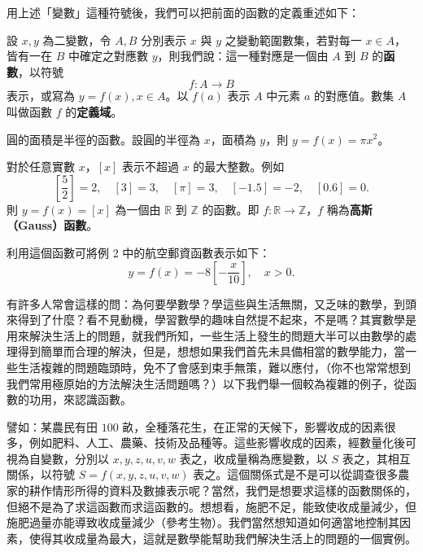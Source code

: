 用上述「變數」這種符號後，我們可以把前面的函數的定義重述如下：
\begin{definition*}
設 $x, y$ 為二變數，令 $A, B$ 分別表示 $x$ 與 $y$ 之變動範圍數集，若對每一 $x \in A$，皆有一在 $B$ 中確定之對應數 $y$，則我們說：這一種對應是一個由 $A$ 到 $B$ 的\textbf{函數}，以符號
\begin{equation*}
  f: A \longrightarrow B
\end{equation*}
表示，或寫為 $y=f(x), x \in A$。以 $f(a)$ 表示 $A$ 中元素 $a$ 的對應值。數集 $A$ 叫做函數 $f$ 的\textbf{定義域}。
\end{definition*}

\begin{example}\label{ex:5-3-3}
圓的面積是半徑的函數。設圓的半徑為 $x$，面積為 $y$，則 $y=f(x)=\pi x^2$。
\end{example}

\begin{example}\label{ex:5-3-4}
對於任意實數 $x$，$[x]$ 表示不超過 $x$ 的最大整數。例如
\begin{equation*}
  \left[\frac{5}{2}\right]=2, \quad [3]=3, \quad [\pi]=3, \quad [-1.5]=-2, \quad [0.6]=0.
\end{equation*}
則 $y=f(x)=[x]$ 為一個由 $\mathbb{R}$ 到 $\mathbb{Z}$ 的函數。即 $f: \mathbb{R} \longrightarrow \mathbb{Z}$，$f$ 稱為\textbf{高斯（Gauss）函數}。
\end{example}

利用這個函數可將例 2 中的航空郵資函數表示如下：
\begin{equation*}
  y = f(x) = -8 \left[-\frac{x}{10}\right], \quad x > 0.
\end{equation*}

有許多人常會這樣的問：為何要學數學？學這些與生活無關，又乏味的數學，到頭來得到了什麼？看不見動機，學習數學的趣味自然提不起來，不是嗎？其實數學是用來解決生活上的問題，就我們所知，一些生活上發生的問題大半可以由數學的處理得到簡單而合理的解決，但是，想想如果我們首先未具備相當的數學能力，當一些生活複雜的問題臨頭時，免不了會感到束手無策，難以應付，（你不也常常想到我們常用極原始的方法解決生活問題嗎？）以下我們舉一個較為複雜的例子，從函數的功用，來認識函數。

譬如：某農民有田 $100$ 畝，全種落花生，在正常的天候下，影響收成的因素很多，例如肥料、人工、農藥、技術及品種等。這些影響收成的因素，經數量化後可視為自變數，分別以 $x, y, z, u, v, w$ 表之，收成量稱為應變數，以 $S$ 表之，其相互關係，以符號 $S=f(x, y, z, u, v, w)$ 表之。這個關係式是不是可以從調查很多農家的耕作情形所得的資料及數據表示呢？當然，我們是想要求這樣的函數關係的，但絕不是為了求這函數而求這函數的。想想看，施肥不足，能致使收成量減少，但施肥過量亦能導致收成量減少（參考生物）。我們當然想知道如何適當地控制其因素，使得其收成量為最大，這就是數學能幫助我們解決生活上的問題的一個實例。

